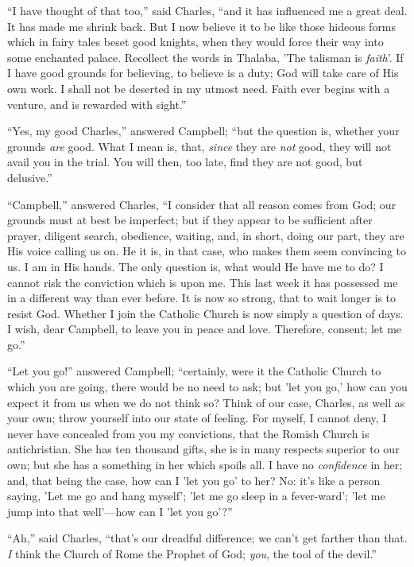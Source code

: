 ``I have thought of that too,'' said Charles, ``and it
has influenced me a great deal. It has made me shrink back. But I now
believe it to be like those hideous forms which in fairy tales beset
good knights, when they would force their way into some enchanted
palace. Recollect the words in Thalaba, 'The talisman is \emph{faith}'.
If I have good grounds for believing, to believe is a duty; God will
take care of His own work. I shall not be deserted in my utmost need.
Faith ever begins with a venture, and is rewarded with sight.''

``Yes, my good Charles,'' answered Campbell; ``but the
question is, whether your grounds \emph{are} good. What I mean is,
that, \emph{since} they are \emph{not} good, they will not avail you
in the trial. You will then, too late, find they are not good, but
delusive.''

``Campbell,'' answered Charles, ``I consider that all
reason comes from God; our grounds must at best be imperfect; but if
they appear to be sufficient after prayer, diligent search, obedience,
waiting, and, in short, doing our part, they are His voice calling us
on. He it is, in that case, who makes them seem convincing to us. I am
in His hands. The only question is, what would He have me to do? I
cannot risk the conviction which is upon me. This last week it has
possessed me in a different way than ever before. It is now so strong,
that to wait longer is to resist God. Whether I join the Catholic
Church is now simply a question of days. I wish, dear Campbell, to
leave you in peace and love. Therefore, consent; let me go.''

``Let you go!'' answered Campbell; ``certainly, were it
the Catholic Church to which you are going, there would be no need to
ask; but 'let you go,' how can you expect it from us when we do not
think so? Think of our case, Charles, as well as your own; throw
yourself into our state of feeling. For myself, I cannot deny, I never
have concealed from you my convictions, that the Romish Church is
antichristian. She has ten thousand gifts, she is in many respects
superior to our own; but she has a something in her which spoils all.
I have no \emph{confidence} in her; and, that being the case, how can
I 'let you go' to her? No: it's like a person saying, 'Let me go and
hang myself'; 'let me go sleep in a fever-ward'; 'let me jump into
that well'—how can I 'let you go'?''

``Ah,'' said Charles, ``that's our dreadful difference;
we can't get farther than that. \emph{I} think the Church of Rome the Prophet of God; \emph{you}, the tool of the devil.''

